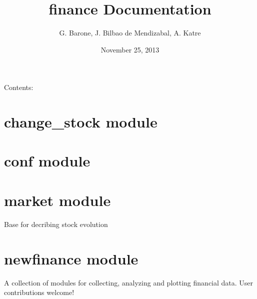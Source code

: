 \documentclass[letterpaper,10pt,english]{sphinxmanual}
\title{finance Documentation}
\date{November 25, 2013}
\author{G. Barone, J. Bilbao de Mendizabal, A. Katre}
\begin{document}
\maketitle
\tableofcontents
{}\label{index::doc}


Contents:


\chapter{change\_stock module}
\label{change_stock::doc}\label{change_stock:welcome-to-finance-s-documentation}\label{change_stock:change-stock-module}

\chapter{conf module}
\label{conf:module-conf}\label{conf:conf-module}\label{conf::doc}

\chapter{market module}
\label{market:module-market}\label{market::doc}\label{market:market-module}

\begin{fulllineitems}
\label{market:market.market}
Base for decribing stock evolution

\begin{fulllineitems}
\label{market:market.market.m_cap}
\end{fulllineitems}


\begin{fulllineitems}
\label{market:market.market.m_time}
\end{fulllineitems}


\end{fulllineitems}



\chapter{newfinance module}
\label{newfinance:module-newfinance}\label{newfinance:newfinance-module}\label{newfinance::doc}
A collection of modules for collecting, analyzing and plotting
financial data.   User contributions welcome!
\end{document}
